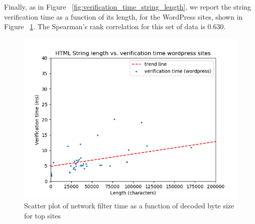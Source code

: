 Finally, as in Figure ~\ref{fig:verification_time_string_length}, we report the string verification time as a function of its length, for the WordPress sites, shown in Figure ~\ref{fig:verification_time_string_length_wordpress}. The Spearman's rank correlation for this set of data is 0.630. 

\begin{figure}[h]
	\includegraphics[scale=0.5]{results/string_length_vs_verification_time_wordpress.png}
	\caption{Scatter plot of network filter time as a function of decoded byte size for top sites}
	\label{fig:verification_time_string_length_wordpress}
\end{figure}